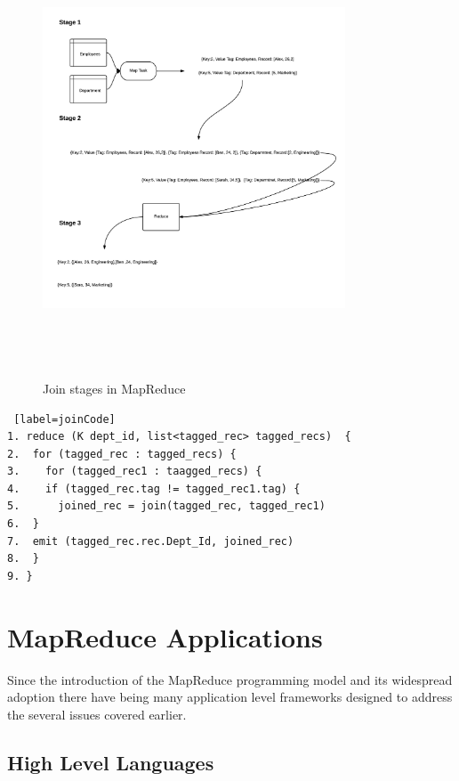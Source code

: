 \documentclass[10pt,twocolumn]{IEEEtran11}
\begin{document}
\begin{figure}[h]
	\centering
	\includegraphics[height = 13cm,width=9cm]{images/mapReduceJoin.png}
	\caption{Join stages in MapReduce}
	\label{fig:mrJoin}
\end{figure}

\begin{lstlisting} [label=joinCode]
1. reduce (K dept_id, list<tagged_rec> tagged_recs)  {
2.  for (tagged_rec : tagged_recs) {
3.    for (tagged_rec1 : taagged_recs) {
4.	  if (tagged_rec.tag != tagged_rec1.tag) {
5.	    joined_rec = join(tagged_rec, tagged_rec1)
6.  }
7.  emit (tagged_rec.rec.Dept_Id, joined_rec)
8.  }
9. }
\end{lstlisting}


\section{MapReduce Applications}

Since the introduction of the MapReduce programming model and its widespread adoption there have being many application level frameworks designed to address the several issues covered earlier.

\subsection{High Level Languages}
\end{document}
